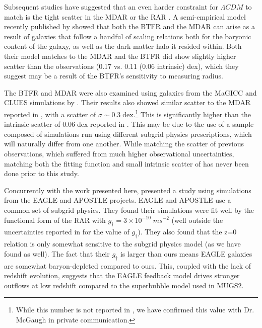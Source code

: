 Subsequent studies have suggested that an even harder constraint for $\Lambda
CDM$ to match is the tight scatter in the MDAR \citep{Wu2015} or the RAR
\citep{Milgrom2016}.  A semi-empirical model recently published by
\citet{DiCintio2016} showed that both the BTFR and the MDAR can arise as a
result of galaxies that follow a handful of scaling relations both for the
baryonic content of the galaxy, as well as the dark matter halo it resided
within. Both their model matches to the MDAR and the BTFR did show slightly
higher scatter than the \citet{Lelli2016a} observations (0.17 vs.  0.11 (0.06
intrinsic) dex), which they suggest may be a result of the BTFR's sensitivity to
measuring radius.

The BTFR and MDAR were also examined using galaxies from the MaGICC
\citep{Stinson2013} and CLUES \citep{Gottloeber2010} simulations by
\citet{SantosSantos2016}.    Their results also showed similar scatter to the
MDAR reported in \citet{McGaugh2014}, with a scatter of
$\sigma\sim0.3\;\mathrm{dex}$.\footnote{While this number is not reported in
\citet{McGaugh2014}, we have confirmed this value with Dr. McGaugh in private
communication.}  This is significantly higher than the intrinsic scatter of
$0.06\;\mathrm{dex}$ reported in \citet{McGaugh2016}.  This may be due to the
use of a sample composed of simulations run using different subgrid physics
prescriptions, which will naturally differ from one another.  While matching the
scatter of previous observations, which suffered from much higher observational
uncertainties, matching both the fitting function and small intrinsic scatter of
\citet{McGaugh2016} has never been done prior to this study.

Concurrently with the work presented here, \citet{Ludlow2016} presented a study
using simulations from the EAGLE \citep{Schaye2015} and APOSTLE
\citep{Sawala2016} projects.  EAGLE and APOSTLE use a common set of subgrid
physics.  They found their simulations were fit well by the \citet{McGaugh2016}
functional form of the RAR with $g_\dagger = 3\times10^{-10}\;ms^{-2}$ (well
outside the uncertainties reported in \citet{McGaugh2016} for the value of
$g_\dagger$).  They also found that the z=0 relation is only somewhat sensitive
to the subgrid physics model (as we have found as well).  The fact that their
$g_\dagger$ is larger than ours means EAGLE galaxies are somewhat
baryon-depleted compared to ours.  This, coupled with the lack of redshift
evolution, suggests that the EAGLE feedback model drives stronger outflows at
low redshift compared to the superbubble model used in MUGS2.

